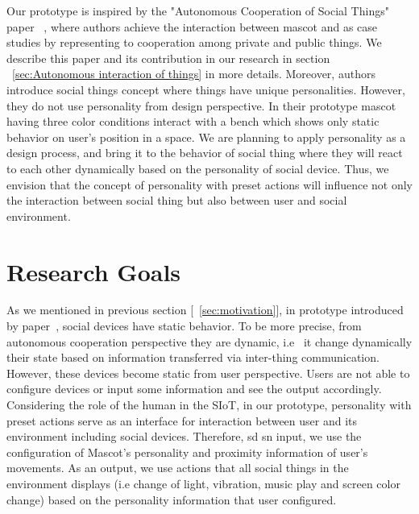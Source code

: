 Our prototype is inspired by the "Autonomous Cooperation of Social Things" paper ~\cite{okada2016autonomous},
where authors achieve the interaction between mascot and as case studies
by representing to cooperation among private and public things.
We describe this paper and its contribution in our research in
section ~\ref{sec:Autonomous interaction of things} in more details.
Moreover, authors introduce social things concept where things have unique personalities.
However, they do not use personality from design perspective.
In their prototype mascot having three color conditions interact with a bench
which shows only static behavior on user's position in a space.
We are planning to apply personality as a design process, and bring it to the behavior of social
thing where they will react to each other dynamically based on the personality of social device.
Thus, we envision that the concept of personality with preset actions will influence
not only the interaction between social thing but also between user and social environment.

\section{Research Goals}
\label{sec:research-goals}
As we mentioned in previous section [~\ref{sec:motivation}], in prototype introduced by
paper~\cite{okada2016autonomous}, social devices have static behavior.
To be more precise, from autonomous cooperation perspective they are dynamic, i.e \ it
change dynamically their state based on information transferred via inter-thing communication.
However, these devices become static from user perspective.
Users are not able to configure devices or input some information and see the output accordingly.
Considering the role of the human in the SIoT, in our prototype, personality with preset actions
serve as an interface for interaction between user and its environment including social devices.
Therefore, sd sn input, we use the configuration of Mascot's personality and proximity information of user's movements.
As an output, we use actions that all social things in the environment displays (i.e change of light,
vibration, music play and screen color change) based on the personality information that user configured.

